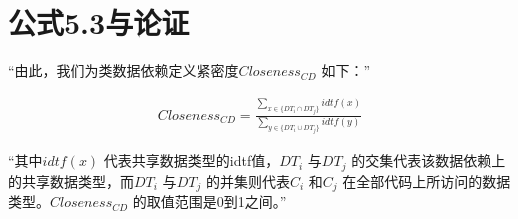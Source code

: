 \section{公式5.3与论证}

“由此，我们为类数据依赖定义紧密度$Closeness_{CD}$ 如下：”

\begin{align}Closeness_{CD}=\frac {\sum _{x \in \{DT_{i}\cap DT_{j}\}}idtf(x)} {\sum _{y \in \{DT_{i}\cup DT_{j}\}}idtf(y)}\end{align}

“其中$idtf(x)$ 代表共享数据类型的idtf值，$DT_i$ 与$DT_j$ 的交集代表该数据依赖上的共享数据类型，而$DT_i$ 与$DT_j$ 的并集则代表$C_i$ 和$C_j$ 在全部代码上所访问的数据类型。$Closeness_{CD}$ 的取值范围是0到1之间。”
